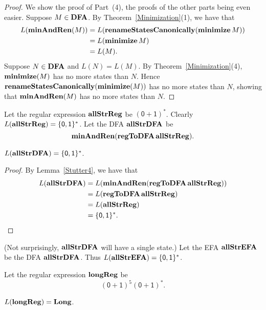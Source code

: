 \begin{proof}
We show the proof of Part~(4), the proofs of the other parts being
even easier.  Suppose $M\in\mathbf{DFA}$.  By Theorem~\ref{Minimization}(1), we
have that
\begin{align*}
L(\mathbf{minAndRen}(M)) &= L(\mathbf{renameStatesCanonically}(\mathbf{minimize}\,M)) \\
                 &= L(\mathbf{minimize}\,M) \\
                 &= L(M) .
\end{align*}
Suppose $N\in\mathbf{DFA}$ and $L(N)=L(M)$.  By Theorem~\ref{Minimization}(4),
$\mathbf{minimize}(M)$ has no more states than $N$.
Hence $\mathbf{renameStatesCanonically}(\mathbf{minimize}(M))$ has no more states than $N$,
showing that $\mathbf{minAndRen}(M)$ has no more states than $N$.
\end{proof}

Let the regular expression $\mathbf{allStrReg}$ be $\mathsf{(0+1)^*}$.
Clearly $L(\mathbf{allStrReg})=\{\mathsf{0,1}\}^*$.  Let the DFA
$\mathbf{allStrDFA}$ be
\begin{displaymath}
\mathbf{minAndRen}(\mathbf{regToDFA}\,\mathbf{allStrReg}) .
\end{displaymath}

\begin{lemma}
\label{Stutter5}
$L(\mathbf{allStrDFA})=\{\mathsf{0,1}\}^*$.
\end{lemma}

\begin{proof}
By Lemma~\ref{Stutter4}, we have that
\begin{align*}
L(\mathbf{allStrDFA}) &= L(\mathbf{minAndRen}(\mathbf{regToDFA}\,\mathbf{allStrReg})) \\
              &= L(\mathbf{regToDFA}\,\mathbf{allStrReg}) \\
              &= L(\mathbf{allStrReg}) \\
              &= \{\mathsf{0,1}\}^* .
\end{align*}
\end{proof}

(Not surprisingly, $\mathbf{allStrDFA}$ will have a single state.)
Let the EFA $\mathbf{allStrEFA}$ be the DFA $\mathbf{allStrDFA}$.  Thus
$L(\mathbf{allStrEFA})=\{\mathsf{0,1}\}^*$.

Let the regular expression $\mathbf{longReg}$ be
\begin{displaymath}
(\mathsf{0+1})^5(\mathsf{0+1})^* .
\end{displaymath}

\begin{lemma}
\label{Stutter6}

$L(\mathbf{longReg}) = \mathbf{Long}$.
\end{lemma}

